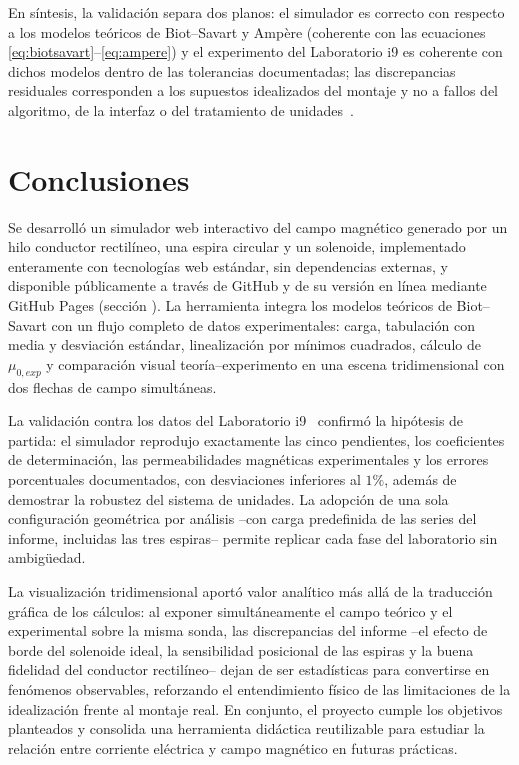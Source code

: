 \documentclass{article}
\begin{document}
En síntesis, la validación separa dos planos: el simulador es correcto con respecto a los modelos teóricos de Biot--Savart y Ampère (coherente con las ecuaciones \eqref{eq:biotsavart}--\eqref{eq:ampere}) y el experimento del Laboratorio i9 es coherente con dichos modelos dentro de las tolerancias documentadas; las discrepancias residuales corresponden a los supuestos idealizados del montaje y no a fallos del algoritmo, de la interfaz o del tratamiento de unidades~\cite{labi9rep}.

\section{Conclusiones} \label{sec:conclusiones}

Se desarrolló un simulador web interactivo del campo magnético generado por un hilo conductor rectilíneo, una espira circular y un solenoide, implementado enteramente con tecnologías web estándar, sin dependencias externas, y disponible públicamente a través de GitHub y de su versión en línea mediante GitHub Pages (sección ). La herramienta integra los modelos teóricos de Biot--Savart con un flujo completo de datos experimentales: carga, tabulación con media y desviación estándar, linealización por mínimos cuadrados, cálculo de $\mu_{0,exp}$ y comparación visual teoría--experimento en una escena tridimensional con dos flechas de campo simultáneas.

La validación contra los datos del Laboratorio i9~\cite{labi9rep} confirmó la hipótesis de partida: el simulador reprodujo exactamente las cinco pendientes, los coeficientes de determinación, las permeabilidades magnéticas experimentales y los errores porcentuales documentados, con desviaciones inferiores al $1\%$, además de demostrar la robustez del sistema de unidades. La adopción de una sola configuración geométrica por análisis --con carga predefinida de las series del informe, incluidas las tres espiras-- permite replicar cada fase del laboratorio sin ambigüedad.

La visualización tridimensional aportó valor analítico más allá de la traducción gráfica de los cálculos: al exponer simultáneamente el campo teórico y el experimental sobre la misma sonda, las discrepancias del informe --el efecto de borde del solenoide ideal, la sensibilidad posicional de las espiras y la buena fidelidad del conductor rectilíneo-- dejan de ser estadísticas para convertirse en fenómenos observables, reforzando el entendimiento físico de las limitaciones de la idealización frente al montaje real. En conjunto, el proyecto cumple los objetivos planteados y consolida una herramienta didáctica reutilizable para estudiar la relación entre corriente eléctrica y campo magnético en futuras prácticas.
\end{document}
